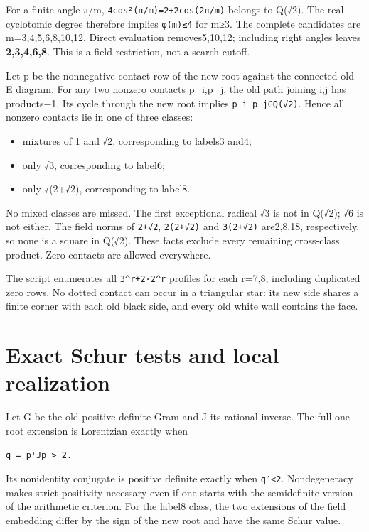 \documentclass[
  10pt,
]{report}
\newcounter{none} %
\providecommand{\tightlist}{%
  \setlength{\itemsep}{0pt}\setlength{\parskip}{0pt}}
\begin{document}
For a finite angle π/m, \texttt{4cos²(π/m)=2+2cos(2π/m)} belongs to
Q(√2). The real cyclotomic degree therefore implies \texttt{φ(m)≤4} for
m≥3. The complete candidates are m=3,4,5,6,8,10,12. Direct evaluation
removes5,10,12; including right angles leaves \textbf{2,3,4,6,8}. This
is a field restriction, not a search cutoff.

Let p be the nonnegative contact row of the new root against the
connected old E diagram. For any two nonzero contacts p\_i,p\_j, the old
path joining i,j has products−1. Its cycle through the new root implies
\texttt{p\_i\ p\_j∈Q(√2)}. Hence all nonzero contacts lie in one of
three classes:

\begin{itemize}
\tightlist
\item
  mixtures of 1 and √2, corresponding to labels3 and4;
\item
  only √3, corresponding to label6;
\item
  only √(2+√2), corresponding to label8.
\end{itemize}

No mixed classes are missed. The first exceptional radical √3 is not in
Q(√2); √6 is not either. The field norms of \texttt{2+√2},
\texttt{2(2+√2)} and \texttt{3(2+√2)} are2,8,18, respectively, so none
is a square in Q(√2). These facts exclude every remaining cross-class
product. Zero contacts are allowed everywhere.

The script enumerates all \texttt{3\^{}r+2·2\^{}r} profiles for each
r=7,8, including duplicated zero rows. No dotted contact can occur in a
triangular star: its new side shares a finite corner with each old black
side, and every old white wall contains the face.

\section{Exact Schur tests and local
realization}\label{exact-schur-tests-and-local-realization}

Let G be the old positive-definite Gram and J its rational inverse. The
full one-root extension is Lorentzian exactly when

\begin{verbatim}
q = pᵀJp > 2.
\end{verbatim}

Its nonidentity conjugate is positive definite exactly when
\texttt{q′\textless{}2}. Nondegeneracy makes strict positivity necessary
even if one starts with the semidefinite version of the arithmetic
criterion. For the label8 class, the two extensions of the field
embedding differ by the sign of the new root and have the same Schur
value.
\end{document}
